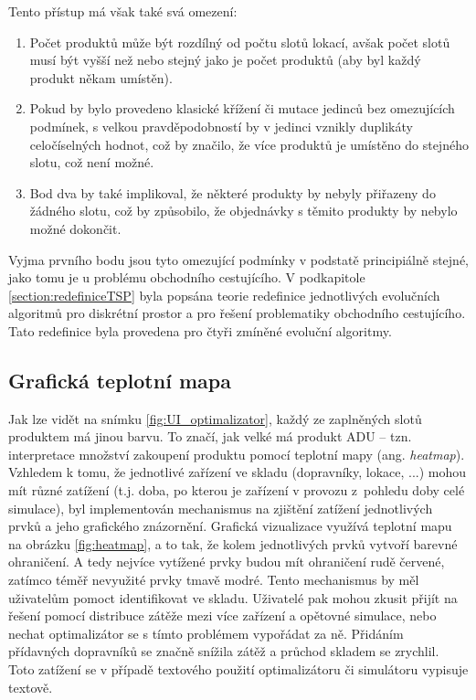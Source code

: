 Tento přístup má však také svá omezení:

\begin{enumerate}
    \item Počet produktů může být rozdílný od počtu slotů lokací, avšak počet slotů musí být vyšší než nebo stejný jako je počet produktů (aby byl každý produkt někam umístěn).
    \item Pokud by bylo provedeno klasické křížení či mutace jedinců bez omezujících podmínek, s velkou pravděpodobností by v jedinci vznikly duplikáty celočíselných hodnot, což by značilo, že více produktů je umístěno do stejného slotu, což není možné.
    \item Bod dva by také implikoval, že některé produkty by nebyly přiřazeny do žádného slotu, což by způsobilo, že objednávky s těmito produkty by nebylo možné dokončit.
\end{enumerate}

Vyjma prvního bodu jsou tyto omezující podmínky v podstatě principiálně stejné, jako tomu je u problému obchodního cestujícího. V podkapitole \ref{section:redefiniceTSP} byla popsána teorie redefinice jednotlivých evolučních algoritmů pro diskrétní prostor a pro řešení problematiky obchodního cestujícího. Tato redefinice byla provedena pro čtyři zmíněné evoluční algoritmy.

\subsection{Grafická teplotní mapa}
Jak lze vidět na snímku \ref{fig:UI_optimalizator}, každý ze zaplněných slotů produktem má jinou barvu. To značí, jak velké má produkt ADU -- tzn. interpretace množství zakoupení produktu pomocí teplotní mapy (ang. \emph{heatmap}). Vzhledem k tomu, že jednotlivé zařízení ve skladu (dopravníky, lokace, ...) mohou mít různé zatížení (t.j. doba, po kterou je zařízení v provozu z~pohledu doby celé simulace), byl implementován mechanismus na zjištění zatížení jednotlivých prvků a jeho grafického znázornění. Grafická vizualizace využívá teplotní mapu na obrázku \ref{fig:heatmap}, a to tak, že kolem jednotlivých prvků vytvoří barevné ohraničení. A tedy nejvíce vytížené prvky budou mít ohraničení rudě červené, zatímco téměř nevyužité prvky tmavě modré. Tento mechanismus by měl uživatelům pomoct identifikovat  ve skladu. Uživatelé pak mohou zkusit přijít na řešení pomocí distribuce zátěže mezi více zařízení a opětovné simulace, nebo nechat optimalizátor se s tímto problémem vypořádat za ně. Přidáním přídavných dopravníků se značně snížila zátěž a průchod skladem se zrychlil. Toto zatížení se v případě textového použití optimalizátoru či simulátoru vypisuje textově.

